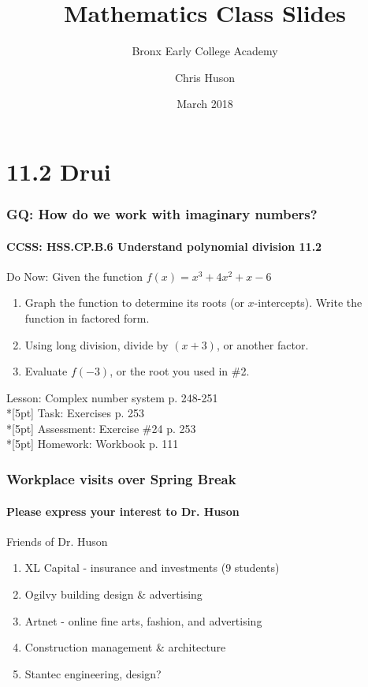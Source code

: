 \documentclass{beamer}
\title{Mathematics Class Slides}
\subtitle{Bronx Early College Academy}
\author{Chris Huson}
\date{March 2018}
\begin{document}
\frame{\titlepage}


\section{11.2 Drui}
\frame
{
  \frametitle{GQ: How do we work with imaginary numbers?}
  \framesubtitle{CCSS: HSS.CP.B.6 Understand polynomial division \qquad \qquad \qquad \alert{11.2}}

  \begin{block}{Do Now: Given the function $f(x)=x^3+4x^2+x-6$}
    \begin{enumerate}
    \item Graph the function to determine its roots (or $x$-intercepts). Write the function in factored form.
    \item Using long division, divide by $(x+3)$, or another factor. 
    \item Evaluate $f(-3)$, or the root you used in \#2.
    \end{enumerate}
  \end{block}
  Lesson: Complex number system p. 248-251\\*[5pt]
  Task: Exercises p. 253\\*[5pt]
  Assessment: Exercise \#24 p. 253\\*[5pt]
  Homework: Workbook p. 111
}

\frame
{
  \frametitle{Workplace visits over Spring Break}
    \framesubtitle{Please express your interest to Dr. Huson}
    \begin{block}{Friends of Dr. Huson} 
        \begin{enumerate}
            \item XL Capital - insurance and investments (9 students)
            \item Ogilvy building design \& advertising
            \item Artnet - online fine arts, fashion, and advertising
            \item Construction management \& architecture
            \item Stantec engineering, design?
        \end{enumerate}
    \end{block}
}
\end{document}
